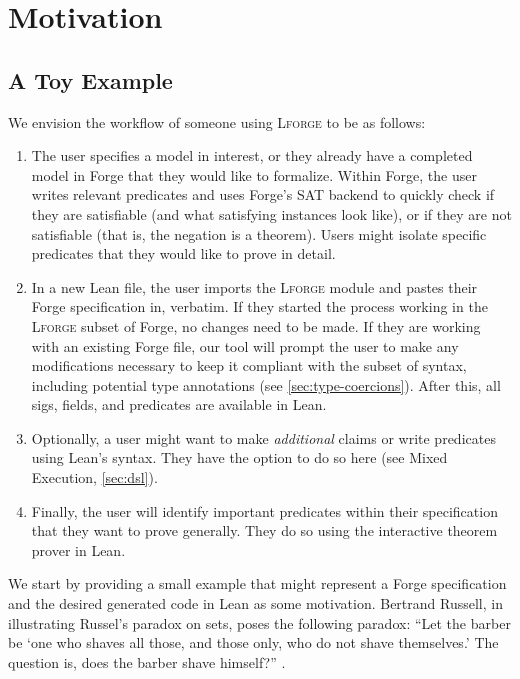 \section{Motivation}


\subsection{A Toy Example}\label{sec:toy-example}

We envision the workflow of someone using \textsc{Lforge} to be as follows: 
\begin{enumerate}
    \item The user specifies a model in interest, or they already have a completed model in Forge that they would like to formalize. Within Forge, the user writes relevant predicates and uses Forge's SAT backend to quickly check if they are satisfiable (and what satisfying instances look like), or if they are not satisfiable (that is, the negation is a theorem). Users might isolate specific predicates that they would like to prove in detail. 
    \item In a new Lean file, the user imports the \textsc{Lforge} module and pastes their Forge specification in, verbatim. If they started the process working in the \textsc{Lforge} subset of Forge, no changes need to be made. If they are working with an existing Forge file, our tool will prompt the user to make any modifications necessary to keep it compliant with the subset of syntax, including potential type annotations (see \cref{sec:type-coercions}). After this, all sigs, fields, and predicates are available in Lean. 
    \item Optionally, a user might want to make \emph{additional} claims or write predicates using Lean's syntax. They have the option to do so here (see Mixed Execution, \cref{sec:dsl}). 
    \item Finally, the user will identify important predicates within their specification that they want to prove generally. They do so using the interactive theorem prover in Lean. 
\end{enumerate}

We start by providing a small example that might represent a Forge specification and the desired generated code in Lean as some motivation. Bertrand Russell, in illustrating Russel's paradox on sets, poses the following paradox: ``Let the barber be `one who shaves all those, and those only, who do not shave themselves.' The question is, does the barber shave himself?'' \cite[101]{russell2009philosophy}. 

